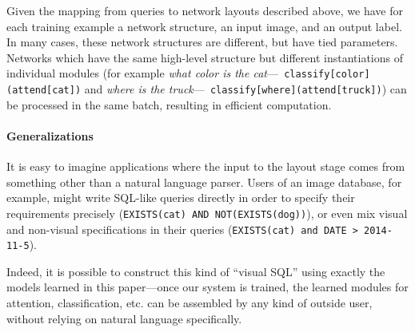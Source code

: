 \documentclass[10pt,twocolumn,letterpaper]{article}
\begin{document}
Given the mapping from queries to network layouts described above, we have for
each training example a network structure, an input image, and an output label.
In many cases, these network structures are different, but have tied parameters.
Networks which have the same high-level structure but different instantiations
of individual modules (for example \emph{what color is the cat}---{\small\tt
classify[color](attend[cat])} and \emph{where is the truck}---{\small\tt
classify[where](attend[truck])}) can be processed in the same batch, resulting
in efficient computation.

\paragraph{Generalizations}

It is easy to imagine applications where the input to the layout stage comes
from something other than a natural language parser. Users of an image database,
for example, might write SQL-like queries directly in order to specify their
requirements precisely ({\tt EXISTS(cat) AND NOT(EXISTS(dog))}), or even mix
visual and non-visual specifications in their queries ({\tt EXISTS(cat) and DATE
> 2014-11-5}).

Indeed, it is possible to construct this kind of ``visual SQL'' using exactly
the models learned in this paper---once our system is trained, the learned
modules for attention, classification, etc. can be assembled by any kind of
outside user, without relying on natural language specifically.
\end{document}

